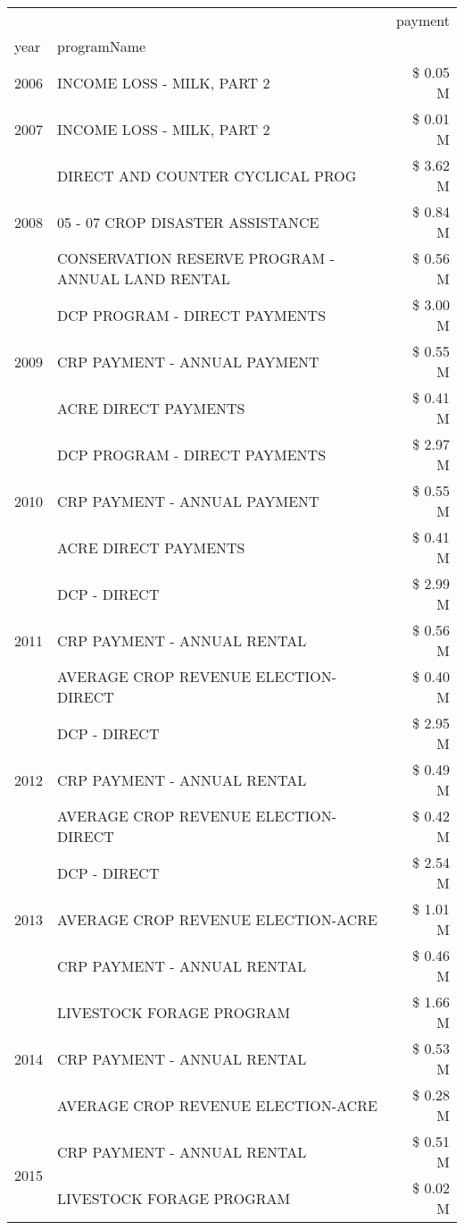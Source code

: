 \begin{tabular}{llr}
\toprule
 &  & payment \\
year & programName &  \\
\midrule
2006 & INCOME LOSS - MILK, PART 2 & \$ 0.05 M \\
\cline{1-3}
2007 & INCOME LOSS - MILK, PART 2 & \$ 0.01 M \\
\cline{1-3}
\multirow[t]{3}{*}{2008} & DIRECT AND COUNTER CYCLICAL PROG & \$ 3.62 M \\
 & 05 - 07 CROP DISASTER ASSISTANCE & \$ 0.84 M \\
 & CONSERVATION RESERVE PROGRAM - ANNUAL LAND RENTAL & \$ 0.56 M \\
\cline{1-3}
\multirow[t]{3}{*}{2009} & DCP PROGRAM - DIRECT PAYMENTS & \$ 3.00 M \\
 & CRP PAYMENT - ANNUAL PAYMENT & \$ 0.55 M \\
 & ACRE DIRECT PAYMENTS & \$ 0.41 M \\
\cline{1-3}
\multirow[t]{3}{*}{2010} & DCP PROGRAM - DIRECT PAYMENTS & \$ 2.97 M \\
 & CRP PAYMENT - ANNUAL PAYMENT & \$ 0.55 M \\
 & ACRE DIRECT PAYMENTS & \$ 0.41 M \\
\cline{1-3}
\multirow[t]{3}{*}{2011} & DCP - DIRECT & \$ 2.99 M \\
 & CRP PAYMENT - ANNUAL RENTAL & \$ 0.56 M \\
 & AVERAGE CROP REVENUE ELECTION-DIRECT & \$ 0.40 M \\
\cline{1-3}
\multirow[t]{3}{*}{2012} & DCP - DIRECT & \$ 2.95 M \\
 & CRP PAYMENT - ANNUAL RENTAL & \$ 0.49 M \\
 & AVERAGE CROP REVENUE ELECTION-DIRECT & \$ 0.42 M \\
\cline{1-3}
\multirow[t]{3}{*}{2013} & DCP - DIRECT & \$ 2.54 M \\
 & AVERAGE CROP REVENUE ELECTION-ACRE & \$ 1.01 M \\
 & CRP PAYMENT - ANNUAL RENTAL & \$ 0.46 M \\
\cline{1-3}
\multirow[t]{3}{*}{2014} & LIVESTOCK FORAGE PROGRAM & \$ 1.66 M \\
 & CRP PAYMENT - ANNUAL RENTAL & \$ 0.53 M \\
 & AVERAGE CROP REVENUE ELECTION-ACRE & \$ 0.28 M \\
\cline{1-3}
\multirow[t]{3}{*}{2015} & CRP PAYMENT - ANNUAL RENTAL & \$ 0.51 M \\
 & LIVESTOCK FORAGE PROGRAM & \$ 0.02 M \\

\end{tabular}
